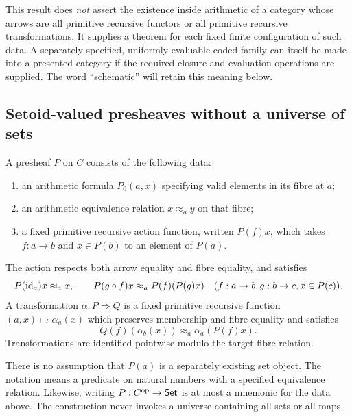 This result does \emph{not} assert the existence inside arithmetic of a
category whose arrows are all primitive recursive functors or all primitive
recursive transformations.  It supplies a theorem for each fixed finite
configuration of such data.  A separately specified, uniformly evaluable
coded family can itself be made into a presented category if the required
closure and evaluation operations are supplied.  The word ``schematic''
will retain this meaning below.

\subsection{Setoid-valued presheaves without a universe of sets}

\begin{definition}
A presheaf $P$ on $C$ consists of the following data:
\begin{enumerate}
\item an arithmetic formula $P_0(a,x)$ specifying valid elements in its fibre
      at $a$;
\item an arithmetic equivalence relation $x\approx_a y$ on that fibre;
\item a fixed primitive recursive action function, written $P(f)x$, which
      takes $f:a\to b$ and $x\in P(b)$ to an element of $P(a)$.
\end{enumerate}
The action respects both arrow equality and fibre equality, and satisfies
\begin{equation}
 P(\operatorname{id}_a)x\approx_a x,\qquad
 P(g\circ f)x\approx_a P(f)(P(g)x)
 \quad(f:a\to b, g:b\to c, x\in P(c)).
 \label{eq:presheaf-laws}
\end{equation}
A transformation $\alpha:P\Rightarrow Q$ is a fixed primitive recursive
function $(a,x)\mapsto\alpha_a(x)$ which preserves membership and fibre
equality and satisfies
\begin{equation}
 Q(f)(\alpha_b(x))\approx_a\alpha_a(P(f)x).
 \label{eq:presheaf-naturality}
\end{equation}
Transformations are identified pointwise modulo the target fibre relation.
\end{definition}

There is no assumption that $P(a)$ is a separately existing set object.  The
notation means a predicate on natural numbers with a specified equivalence
relation.  Likewise, writing $P:C^{\mathrm{op}}\to\mathsf{Set}$ is at most a
mnemonic for the data above.  The construction never invokes a universe
containing all sets or all maps.

